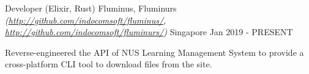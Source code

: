 

\begin{cventries}


  \cventry
  {Developer (Elixir, Rust)} %
  {Fluminus, Fluminurs \textmd{\em\tiny(\url{http://github.com/indocomsoft/fluminus/}, \url{http://github.com/indocomsoft/fluminurs/})}} %
  {Singapore} %
  {Jan 2019 - PRESENT} %
  {
    \begin{cvitems} %
      \item {Reverse-engineered the API of NUS Learning Management System to provide a cross-platform CLI tool to download files from the site.}
    \end{cvitems}
  }


\end{cventries}
